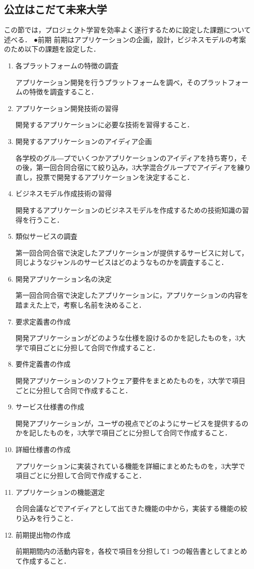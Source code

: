 \subsection{公立はこだて未来大学}
\par この節では，プロジェクト学習を効率よく遂行するために設定した課題について述べる．
●前期
前期はアプリケーションの企画，設計，ビジネスモデルの考案のため以下の課題を設定した．
\begin{enumerate}
\item 各プラットフォームの特徴の調査
\par アプリケーション開発を行うプラットフォームを調べ，そのプラットフォームの特徴を調査すること．
\item アプリケーション開発技術の習得 
\par 開発するアプリケーションに必要な技術を習得すること．
\item 開発するアプリケーションのアイディア企画
\par 各学校のグル―プでいくつかアプリケーションのアイディアを持ち寄り，その後，第一回合同合宿にて絞り込み，3大学混合グループでアイディアを練り直し，投票で開発するアプリケーションを決定すること．
\item ビジネスモデル作成技術の習得
\par 開発するアプリケーションのビジネスモデルを作成するための技術知識の習得を行うこと．
\item 類似サービスの調査
\par 第一回合同合宿で決定したアプリケーションが提供するサービスに対して，同じようなジャンルのサービスはどのようなものかを調査すること．\item 開発アプリケーション名の決定
\par 第一回合同合宿で決定したアプリケーションに，アプリケーションの内容を踏まえた上で，考察し名前を決めること．
\item 要求定義書の作成
\par 開発アプリケーションがどのような仕様を設けるのかを記したものを，3大学で項目ごとに分担して合同で作成すること．
\item 要件定義書の作成
\par 開発アプリケーションのソフトウェア要件をまとめたものを，3大学で項目ごとに分担して合同で作成すること．
\item サービス仕様書の作成
\par 開発アプリケーションが，ユーザの視点でどのようにサービスを提供するのかを記したものを，3大学で項目ごとに分担して合同で作成すること．
\item 詳細仕様書の作成
\par アプリケーションに実装されている機能を詳細にまとめたものを，3大学で項目ごとに分担して合同で作成すること．
\item アプリケーションの機能選定
\par 合同会議などでアイディアとして出てきた機能の中から，実装する機能の絞り込みを行うこと．
\item  前期提出物の作成
\par 前期期間内の活動内容を，各校で項目を分担して1 つの報告書としてまとめて作成すること．
\end{enumerate}

